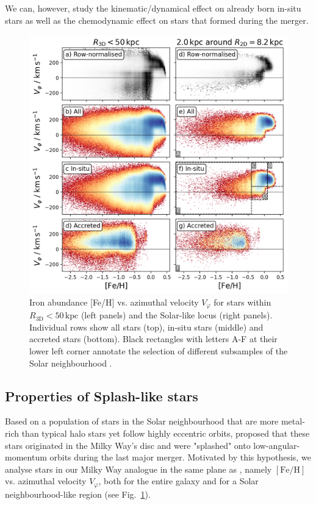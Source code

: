 \documentclass[fleqn,usenatbib]{mnras}
\begin{document}
We can, however, study the kinematic/dynamical effect on already born in-situ stars as well as the chemodynamic effect on stars that formed during the merger.

\begin{figure}
    \centering
    \includegraphics[width=\columnwidth]{figures/splash_feh_vphi.png}
    \caption{{Iron abundance [Fe/H]} vs. azimuthal velocity $V_\varphi$ for stars within $R_\mathrm{3D} < 50\,\mathrm{kpc}$ (left panels) and the Solar-like locus (right panels). Individual rows show all stars (top), in-situ stars (middle) and accreted stars (bottom). Black rectangles with letters A-F at their lower left corner annotate the selection of different subsamples of the Solar neighbourhood \href{https://github.com/svenbuder/gse_nihaouhd/tree/main/figures}{\faGithub}.}
    \label{fig:splash_feh_vphi}
\end{figure}

\subsection{Properties of Splash-like stars}

Based on a population of stars in the Solar neighbourhood that are more metal-rich than typical halo stars yet follow highly eccentric orbits, \citet{Belokurov2020} proposed that these stars originated in the Milky Way’s disc and were "splashed" onto low-angular-momentum orbits during the last major merger. Motivated by this hypothesis, we analyse stars in our Milky Way analogue in the same plane as \citet{Belokurov2020}, namely $\mathrm{[Fe/H]}$ vs. azimuthal velocity $V_\varphi$, both for the entire galaxy and for a Solar neighbourhood-like region (see Fig.~\ref{fig:splash_feh_vphi}).
\end{document}
